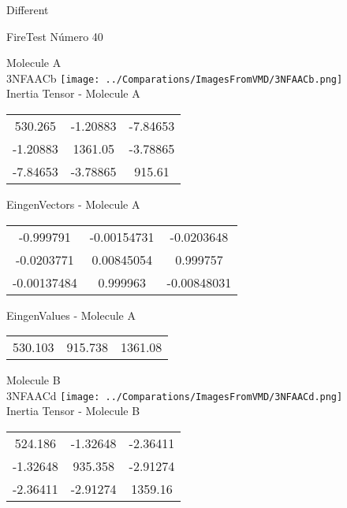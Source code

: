 \begin{center}
\vtab
\vtab
\textcolor{NavyBlue}{\Large Different}
\end{center}

 \newpage

\vtab[-2cm]
\begin{center}
{\large FireTest \tab Número 40}
\end{center}
\begin{multicols}{2}
\begin{center}

Molecule A \\ 
3NFAACb
\texttt{[image: ../Comparations/ImagesFromVMD/3NFAACb.png]}
\\
Inertia Tensor - Molecule A \\
\vtab

\begin{tabular}{|c c c|}
530.265	 & 	-1.20883	 & 	-7.84653	 \\
-1.20883	 & 	1361.05	 & 	-3.78865	 \\
-7.84653	 & 	-3.78865	 & 	915.61
\end{tabular}

\vtab
 EingenVectors - Molecule A     \\
\vtab
\begin{tabular}{|c c c|}
-0.999791	 & 	-0.00154731	 & 	-0.0203648	 \\
-0.0203771	 & 	0.00845054	 & 	0.999757	 \\
-0.00137484	 & 	0.999963	 & 	-0.00848031
\end{tabular}

\vtab
 EingenValues - Molecule A     \\
\vtab
\begin{tabular}{|c c c|}
530.103	 & 	915.738	 & 	1361.08	 \\
\end{tabular}
\columnbreak

Molecule B \\ 
3NFAACd
\texttt{[image: ../Comparations/ImagesFromVMD/3NFAACd.png]}
\\
Inertia Tensor - Molecule B \\
\vtab

\begin{tabular}{|c c c|}
524.186	 & 	-1.32648	 & 	-2.36411	 \\
-1.32648	 & 	935.358	 & 	-2.91274	 \\
-2.36411	 & 	-2.91274	 & 	1359.16
\end{tabular}


\end{center}
\end{multicols}

